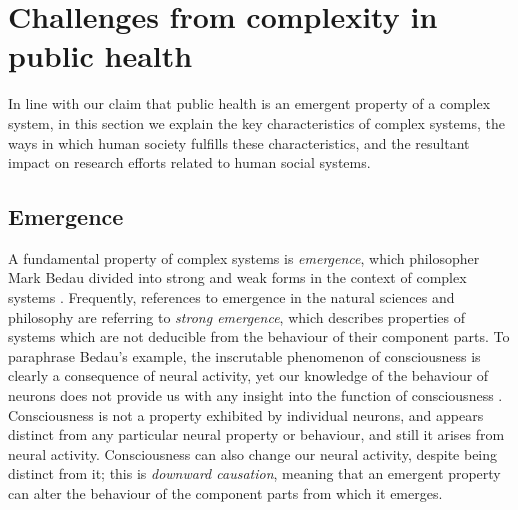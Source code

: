\documentclass[review]{elsarticle}
\begin{document}


\section{Challenges from complexity in public health}

In line with our claim that public health is an emergent property of a complex system, in this section we explain the key characteristics of complex systems, the ways in which human society fulfills these characteristics, and the resultant impact on research efforts related to human social systems. 
 
\subsection{Emergence}
A fundamental property of complex systems is \emph{emergence}, which philosopher Mark Bedau divided into strong and weak forms in the context of complex systems \citep{bedau97b}.  Frequently, references to emergence in the natural sciences and philosophy are referring to \emph{strong emergence}, which describes properties of systems which are not deducible from the behaviour of their component parts. To paraphrase Bedau's example, the inscrutable phenomenon of consciousness is clearly a consequence of neural activity, yet our knowledge of the behaviour of neurons does not provide us with any insight into the function of consciousness \citep{bedau97b}.  Consciousness is not a property exhibited by individual neurons, and appears distinct from any particular neural property or behaviour, and still it arises from neural activity.  Consciousness can also change our neural activity, despite being distinct from it; this is \emph{downward causation}, meaning that an emergent property can alter the behaviour of the component parts from which it emerges.   
\end{document}
